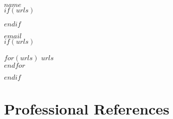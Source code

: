 \documentclass[$fontsize$, a4paper]{article}
\begin{document}
{\LARGE $name$}\\[.2cm]

$if(urls)$
\begin{multicols}{2}
$endif$

\vspace{-10pt}

\href{mailto:$email$}{$email$}\\

$if(urls)$
\columnbreak

$for(urls)$
\href{http://$urls$}{$urls$}\\
$endfor$
\end{multicols}
$endif$







\section*{Professional References}

\subsection*{ }
\end{document}
